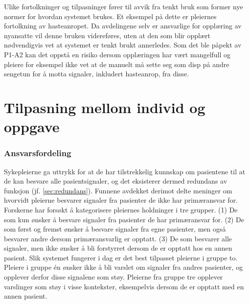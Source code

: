 \noindent
Ulike fortolkninger og tilpasninger fører til avvik fra tenkt bruk som former nye normer for hvordan systemet brukes. Et eksempel på dette er pleiernes fortolkning av hasteanropet. Da avdelingene selv er ansvarlige for opplæring av nyansatte vil denne bruken videreføres, uten at den som blir opplært nødvendigvis vet at systemet er tenkt brukt annerledes. Som det ble påpekt av P1-A2 kan det oppstå en risiko dersom opplæringen har vært mangelfull og pleiere for eksempel ikke vet at de manuelt må sette seg som disp på andre sengetun for å motta signaler, inkludert hasteanrop, fra disse.

\section{Tilpasning mellom individ og oppgave}

\subsubsection{Ansvarsfordeling}
Sykepleierne ga uttrykk for at de har tilstrekkelig kunnskap om pasientene til at de kan besvare alle pasientsignaler, og det eksisterer dermed redundans av funksjon (jf. \ref{sec:redundans}). Funnene avdekket derimot delte meninger om hvorvidt pleierne besvarer signaler fra pasienter de ikke har primæransvar for. Forskerne har forsøkt å kategorisere pleiernes holdninger i tre grupper. (1) De som kun ønsker å besvare signaler fra pasienter de har primæransvar for. (2) De som  først og fremst ønsker å besvare signaler fra egne pasienter, men også besvarer andre dersom primæransvarlig er opptatt. (3) De som besvarer alle signaler, men ikke ønsker å bli forstyrret dersom de er opptatt hos en annen pasient. Slik systemet fungerer i dag er det best tilpasset pleierne i gruppe to. Pleiere i gruppe én ønsker ikke å bli varslet om signaler fra andres pasienter, og opplever derfor disse signalene som støy. Pleierne fra gruppe tre opplever varslinger som støy i visse kontekster, eksempelvis dersom de er opptatt med en annen pasient.


